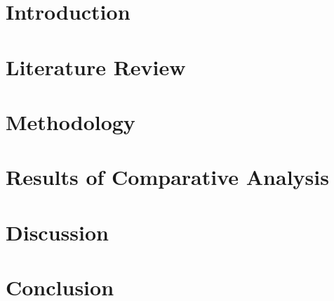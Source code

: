\documentclass[11pt,jaso]{pnumasterh}
\begin{document}
\maketitle 
\pagestyle{empty}
\newpage
\pagestyle{plain} 
\setlength\cftsecnumwidth{2.3em}
\tableofcontents
\newpage
\listoffigures 
\newpage
\listoftables 
\newpage

\newpage

\newpage
{}

\section{Introduction}

\clearpage

\section{Literature Review} \label{literature_review}

\clearpage

\section{Methodology}

\clearpage

\section{Results of Comparative Analysis} \label{results}


\section{Discussion}

\clearpage

\section{Conclusion}

\clearpage
\nocite{*}


\clearpage

\appendix

\clearpage

\end{document}
